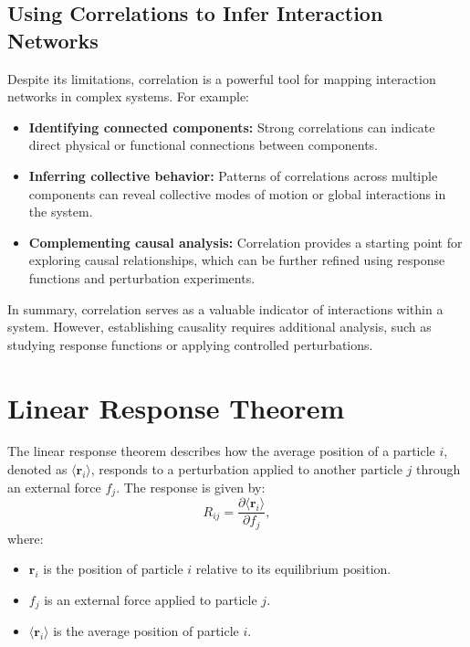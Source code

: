 \documentclass[English, Lau, oneside]{sapthesis}
\begin{document}
\subsection{Using Correlations to Infer Interaction Networks}

\noindent Despite its limitations, correlation is a powerful tool for mapping interaction networks in complex systems. For example:
\begin{itemize}
    \item \textbf{Identifying connected components:} Strong correlations can indicate direct physical or functional connections between components.
    \item \textbf{Inferring collective behavior:} Patterns of correlations across multiple components can reveal collective modes of motion or global interactions in the system.
    \item \textbf{Complementing causal analysis:} Correlation provides a starting point for exploring causal relationships, which can be further refined using response functions and perturbation experiments.
\end{itemize}

In summary, correlation serves as a valuable indicator of interactions within a system. However, establishing causality requires additional analysis, such as studying response functions or applying controlled perturbations.
\section{Linear Response Theorem}

\noindent The linear response theorem describes how the average position of a particle $i$, denoted as $\langle \mathbf{r}_i \rangle$, responds to a perturbation applied to another particle $j$ through an external force $f_j$. The response is given by:
\begin{equation}
R_{ij} = \frac{\partial \langle \mathbf{r}_i \rangle}{\partial f_j},
\end{equation}
where:
\begin{itemize}
    \item $\mathbf{r}_i$ is the position of particle $i$ relative to its equilibrium position.
    \item $f_j$ is an external force applied to particle $j$.
    \item $\langle \mathbf{r}_i \rangle$ is the average position of particle $i$.
\end{itemize}
\end{document}
